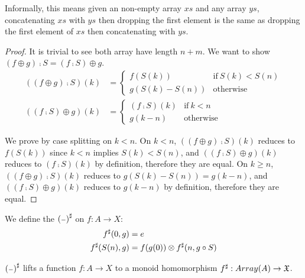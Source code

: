 Informally, this means given an non-empty array $xs$ and any array $ys$,
concatenating $xs$ with $ys$ then dropping the first element is the same as
dropping the first element of $xs$ then concatenating with $ys$.

\begin{proof}
It is trivial to see both array have length $n + m$. We want to show $(f \oplus g) \comp S = (f \comp S) \oplus g$.
\begin{align*}
   ((f \oplus g) \comp S)(k) & = \begin{cases}
       f(S(k)) & \text{if}\ S(k) < S(n) \\
       g(S(k) - S(n)) & \text{otherwise}
   \end{cases} \\
   ((f \comp S) \oplus g)(k) & = \begin{cases}
       (f \comp S)(k) & \text{if}\ k < n \\
       g(k - n) & \text{otherwise}
   \end{cases}
\end{align*}

We prove by case splitting on $k < n$.
On $k < n$, $((f \oplus g) \comp S)(k)$ reduces to $f(S(k))$ since $k < n$ implies $S(k) < S(n)$,
and $((f \comp S) \oplus g)(k)$ reduces to $(f \comp S)(k)$ by definition, therefore they are equal.
On $k \geq n$, $((f \oplus g) \comp S)(k)$ reduces to $g(S(k) - S(n)) = g(k - n)$,
and $((f \comp S) \oplus g)(k)$ reduces to $g(k - n)$ by definition, therefore they are equal.
\end{proof}

We define the ${({\scriptstyle{-}})}^{\sharp}$ on $f : A \to X$:
\begin{align*}
    {f}^{\sharp}(0 , g) & = e \\
    {f}^{\sharp}(S(n) , g) & = f(g(0)) \otimes {f}^{\sharp}(n , g \circ S)
\end{align*} 

\begin{proposition}
    ${({\scriptstyle{-}})}^{\sharp}$ lifts a function $f : A \to X$ to a monoid homomorphism ${f}^{\sharp} : Array(A) \to \mathfrak{X}$.
\end{proposition}

